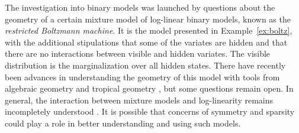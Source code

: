 \documentclass[cclicense]{hmcthesis}
\numberwithin{equation}{chapter}
\numberwithin{ucounter}{chapter}
\begin{document}
    The investigation into binary models was launched by questions about the
    geometry of a certain mixture model of log-linear binary models, known as
    the \emph{restricted Boltzmann machine}.  It is the model presented in
    Example~\ref{ex:boltz}, with the additional stipulations that some of the
    variates are hidden and that there are no interactions between visible and
    hidden variates.  The visible distribution is the marginalization over all
    hidden states.  There have recently been advances in understanding the
    geometry of this model with tools from algebraic geometry and tropical
    geometry \citep{CMS09}, but some questions remain open.  In general, the
    interaction between mixture models and log-linearity remains incompletely
    understood \citep{DSS08}.  It is possible that concerns of symmetry and
    sparsity could play a role in better understanding and using such models.

\appendix



\backmatter




\end{document}
